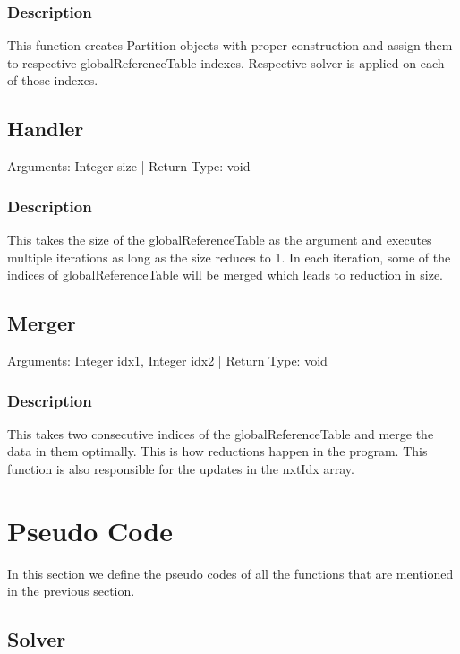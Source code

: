 \documentclass{article}
\begin{document}
\begin{flushleft}
\subsubsection*{Description}
This function creates Partition objects with proper construction and assign them to respective globalReferenceTable indexes. Respective solver is applied on each of those indexes.

\subsection{Handler}

Arguments: Integer size | Return Type: void

\subsubsection*{Description}
This takes the size of the globalReferenceTable as the argument and executes multiple iterations as long as the size reduces to 1. In each iteration, some of the indices of globalReferenceTable will be merged which leads to reduction in size.

\subsection{Merger}

Arguments: Integer idx1, Integer idx2 | Return Type: void

\subsubsection*{Description}
This takes two consecutive indices of the globalReferenceTable and merge the data in them optimally. This is how reductions happen in the program. This function is also responsible for the updates in the nxtIdx array.

\newpage

\section{Pseudo Code}

In this section we define the pseudo codes of all the functions that are mentioned 
in the previous section.

\subsection{Solver}


\end{flushleft}
\end{document}
